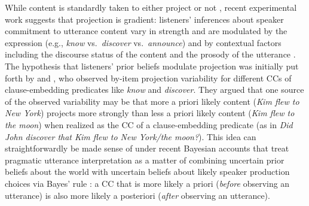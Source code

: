 \documentclass[OpenMind]{stjour}
\begin{document}
While content is standardly taken to either project or not \citep{beaver-geurts-sep}, recent experimental work suggests that projection is gradient: listeners' inferences about speaker commitment to utterance content vary in strength and are modulated by the expression (e.g., {\em know} vs.\ {\em discover} vs.\ {\em announce}) and by contextual factors including the discourse status of the content and the prosody of the utterance \citep[for an overview see][]{tbd-variability}. The hypothesis that listeners' prior beliefs modulate projection was initially put forth by \citet{stevens-etal2017} and \citet{tbd-variability}, who observed by-item projection variability for different CCs of clause-embedding predicates like \emph{know} and \emph{discover}. They argued that one source of the observed variability may be that more a priori likely content ({\em Kim flew to New York}) projects more strongly than less a priori likely content  ({\em Kim flew to the moon}) when realized as the CC of a clause-embedding predicate (as in \emph{Did John discover that Kim flew to New York/the moon?}). This idea can straightforwardly be made sense of under recent Bayesian accounts that treat pragmatic utterance interpretation as a matter of combining uncertain prior beliefs about the world with uncertain beliefs about likely speaker production choices via Bayes' rule \citep{GoodmanFrank2016, degen-etal2015}: a CC that is more likely a priori (\emph{before} observing an utterance) is also more likely a posteriori (\emph{after} observing an utterance).


\end{document}
